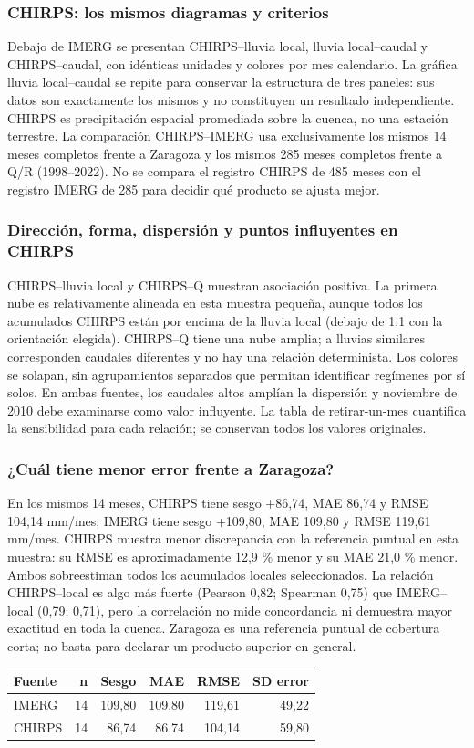 \documentclass[10pt,a4paper]{article}
\begin{document}
\subsubsection*{CHIRPS: los mismos diagramas y criterios}
Debajo de IMERG se presentan CHIRPS--lluvia local, lluvia local--caudal y CHIRPS--caudal, con idénticas unidades y colores por mes calendario. La gráfica lluvia local--caudal se repite para conservar la estructura de tres paneles: sus datos son exactamente los mismos y no constituyen un resultado independiente. CHIRPS es precipitación espacial promediada sobre la cuenca, no una estación terrestre. La comparación CHIRPS--IMERG usa exclusivamente los mismos 14 meses completos frente a Zaragoza y los mismos 285 meses completos frente a Q/R (1998--2022). No se compara el registro CHIRPS de 485 meses con el registro IMERG de 285 para decidir qué producto se ajusta mejor.
\subsubsection*{Dirección, forma, dispersión y puntos influyentes en CHIRPS}
CHIRPS--lluvia local y CHIRPS--Q muestran asociación positiva. La primera nube es relativamente alineada en esta muestra pequeña, aunque todos los acumulados CHIRPS están por encima de la lluvia local (debajo de 1:1 con la orientación elegida). CHIRPS--Q tiene una nube amplia; a lluvias similares corresponden caudales diferentes y no hay una relación determinista. Los colores se solapan, sin agrupamientos separados que permitan identificar regímenes por sí solos. En ambas fuentes, los caudales altos amplían la dispersión y noviembre de 2010 debe examinarse como valor influyente. La tabla de retirar-un-mes cuantifica la sensibilidad para cada relación; se conservan todos los valores originales.
\subsubsection*{¿Cuál tiene menor error frente a Zaragoza?}
En los mismos 14 meses, CHIRPS tiene sesgo +86,74, MAE 86,74 y RMSE 104,14 mm/mes; IMERG tiene sesgo +109,80, MAE 109,80 y RMSE 119,61 mm/mes. CHIRPS muestra menor discrepancia con la referencia puntual en esta muestra: su RMSE es aproximadamente 12,9 \% menor y su MAE 21,0 \% menor. Ambos sobreestiman todos los acumulados locales seleccionados. La relación CHIRPS--local es algo más fuerte (Pearson 0,82; Spearman 0,75) que IMERG--local (0,79; 0,71), pero la correlación no mide concordancia ni demuestra mayor exactitud en toda la cuenca. Zaragoza es una referencia puntual de cobertura corta; no basta para declarar un producto superior en general.
\begin{center}\small\begin{tabular}{lrrrrr}\hline
Fuente & n & Sesgo & MAE & RMSE & SD error \\ \hline
IMERG & 14 & 109,80 & 109,80 & 119,61 & 49,22 \\
CHIRPS & 14 & 86,74 & 86,74 & 104,14 & 59,80 \\
\hline\end{tabular}\end{center}
\end{document}
